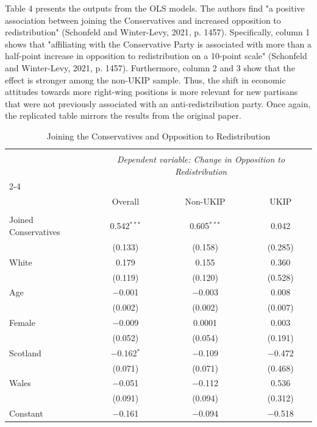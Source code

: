 \documentclass[12pt,letterpaper]{article}
\begin{document}
	Table 4 presents the outputs from the OLS models. The authors find "a positive association between joining the Conservatives and increased opposition to redistribution" (Schonfeld and Winter-Levy, 2021, p. 1457). Specifically, column 1 shows that "affiliating with the Conservative Party is associated with more than a half-point increase in opposition to redistribution on a 10-point scale" (Schonfeld and Winter-Levy, 2021, p. 1457). Furthermore, column 2 and 3 show that the effect is stronger among the non-UKIP sample. Thus, the shift in economic attitudes towards more right-wing positions is more relevant for new partisans that were not previously associated with an anti-redistribution party. Once again, the replicated table mirrors the results from the original paper.
	
	\begin{table}[H] \centering 
		\caption{Joining the Conservatives and Opposition to Redistribution} 
		\label{tab:joiningconservatives} 
		\begin{tabular}{@{\extracolsep{3pt}}lccc} 
			\\[-1.8ex]\hline 
			\hline \\[-1.8ex] 
			& \multicolumn{3}{c}{\textit{Dependent variable: Change in Opposition to Redistribution}} \\ 
			\cline{2-4} 
			\\[-1.8ex] & Overall & Non-UKIP & UKIP \\ 
			\hline \\[-1.8ex] 
			Joined Conservatives & 0.542$^{***}$ & 0.605$^{***}$ & 0.042 \\ 
			& (0.133) & (0.158) & (0.285) \\ 
			White & 0.179 & 0.155 & 0.360 \\ 
			& (0.119) & (0.120) & (0.528) \\ 
			Age & $-$0.001 & $-$0.003 & 0.008 \\ 
			& (0.002) & (0.002) & (0.007) \\ 
			Female & $-$0.009 & 0.0001 & 0.003 \\ 
			& (0.052) & (0.054) & (0.191) \\ 
			Scotland & $-$0.162$^{*}$ & $-$0.109 & $-$0.472 \\ 
			& (0.071) & (0.071) & (0.468) \\ 
			Wales & $-$0.051 & $-$0.112 & 0.536 \\ 
			& (0.091) & (0.094) & (0.312) \\ 
			Constant & $-$0.161 & $-$0.094 & $-$0.518 \\ 

\end{tabular}
\end{table}
\end{document}

